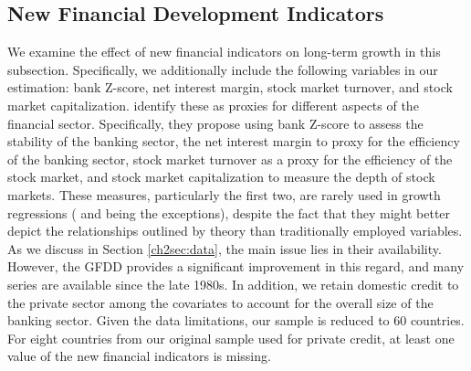 \begin{refsection}
\subsection{New Financial Development Indicators}
We examine the effect of new financial indicators on long-term growth in this subsection. Specifically, we additionally include the following variables in our estimation: bank Z-score, net interest margin, stock market turnover, and stock market capitalization. \textcite{Cihaketal2013} identify these as proxies for different aspects of the financial sector. Specifically, they propose using bank Z-score to assess the stability of the banking sector, the net interest margin to proxy for the efficiency of the banking sector, stock market turnover as a proxy for the efficiency of the stock market, and stock market capitalization to measure the depth of stock markets. These measures, particularly the first two, are rarely used in growth regressions (\textcite{Bergeretal2004} and \textcite{Hasanetal2009} being the exceptions), despite the fact that they might better depict the relationships outlined by theory than traditionally employed variables. As we discuss in Section \ref{ch2sec:data}, the main issue lies in their availability. However, the \ac{GFDD} provides a significant improvement in this regard, and many series are available since the late 1980s. In addition, we retain domestic credit to the private sector among the covariates to account for the overall size of the banking sector. Given the data limitations, our sample is reduced to 60 countries. For eight countries from our original sample used for private credit, at least one value of the new financial indicators is missing.


\end{refsection}
